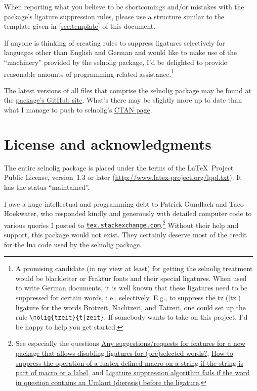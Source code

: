 \documentclass[11pt]{article}
\newcommand{\pkg}[1]{\textsf{#1}}
\begin{document}
When reporting what you believe to be shortcomings and/or mistakes with the package's ligature suppression rules, please use a structure similar to the template given in \cref{sec:template} of this document. 

If anyone is thinking of creating rules to suppress ligatures selectively for languages other than English and German and would like to make use of the \enquote{machinery} provided by the \pkg{selnolig} package, I'd be delighted to provide reasonable amounts of programming-related assistance.\footnote{A promising candidate (in my view at least) for getting the \pkg{selnolig} treatment would be {\blackletter blackletter} or {\blackletter Fraktur} fonts and their special ligatures. When used to write German documents, it is well known that these ligatures need to be suppressed for certain words, i.e., selectively. E.g., to suppress the {\blackletter tz} (|tz|) ligature for the words {\blackletter Brotzeit}, {\blackletter Nachtzeit}, and {\blackletter Tatzeit}, one could set up the rule \Verb+\nolig{tzeit}{t|zeit}+. If somebody wants to take on this project, I'd be happy to help you get started.}

The latest versions of all files that comprise the \pkg{selnolig} package may be found at the  \href{https://github.com/micoloretan/selnolig}{package's GitHub site}. What's there may be slightly more up to date than what I manage to push to \pkg{selnolig}'s \href{http://ctan.org/tex-archive/macros/luatex/latex/selnolig}{CTAN page}.

\section{License and acknowledgments} \label{sec:thanks}

The entire \pkg{selnolig} package is placed under the terms of the \LaTeX\ Project Public License, version~1.3 or later (\url{http://www.latex-project.org/lppl.txt}).
It has the status \enquote{maintained}.

I owe a huge intellectual and programming debt to Patrick Gundlach and Taco Hoekwater, who responded kindly and generously with detailed computer code to various queries I posted to \href{http://tex.stackexchange.com}{\texttt{tex.stackexchange.com}}.\footnote{See especially the questions \href{http://tex.stackexchange.com/q/37443/5001}{Any suggestions/requests for features for a new package that allows disabling ligatures for (pre)selected words?}, \href{http://tex.stackexchange.com/q/48516/5001}{How to suppress the operation of a luatex-defined macro on a string if the string is part of macro or a label}, and \href{http://tex.stackexchange.com/q/63005/5001}{Ligature suppression algorithm fails if the word in question contains an Umlaut (dieresis) before the ligature}.} Without their help and support, this package would not exist. They certainly deserve most of the credit for the lua code used by the \pkg{selnolig} package.
\end{document}
